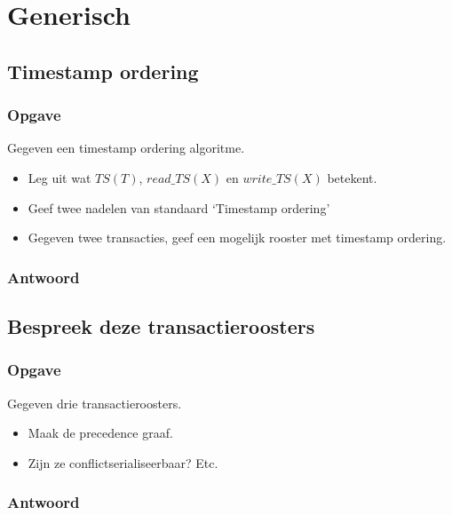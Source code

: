 \documentclass[transacties.tex]{subfiles}
\begin{document}
\chapter{Generisch}
\renewcommand\thesection{V\arabic{section}}
\renewcommand\thesubsection{V\arabic{section}}

\section{Timestamp ordering}
\subsection*{Opgave}
Gegeven een timestamp ordering algoritme.
\begin{itemize}
\item Leg uit wat $TS(T)$, $read\_TS(X)$ en $write\_TS(X)$ betekent.
\item Geef twee nadelen van standaard `Timestamp ordering'
\item Gegeven twee transacties, geef een mogelijk rooster met timestamp ordering.
\end{itemize}
\subsection*{Antwoord}

\section{Bespreek deze transactieroosters}
\subsection*{Opgave}
Gegeven drie transactieroosters.
\begin{itemize}
\item Maak de precedence graaf.
\item Zijn ze conflictserialiseerbaar? Etc.
\end{itemize}
\subsection*{Antwoord}
\end{document}
